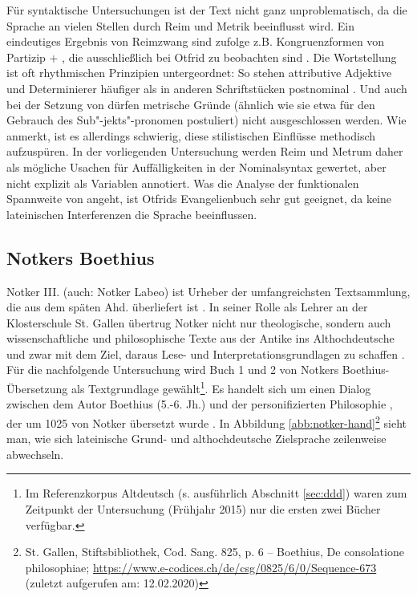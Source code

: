 Für syntaktische Untersuchungen ist der Text nicht ganz unproblematisch, da die Sprache an vielen Stellen durch Reim und Metrik beeinflusst wird. Ein eindeutiges Ergebnis von  Reimzwang sind \textcite[35f.]{Fleischer2006} zufolge z.B. Kongruenzformen von Partizip + , die ausschließlich bei Otfrid zu beobachten sind \parencites()()[s. auch][52]{Fleischer2011}[]{Gillmann2016}. 
Die Wortstellung ist oft rhythmischen Prinzipien untergeordnet: So stehen attributive Adjektive und Determinierer häufiger als in anderen Schriftstücken postnominal \parencites()()[282f.]{Oubouzar1989}[29]{Schrodt2004}. Und auch bei der Setzung von  dürfen metrische Gründe (ähnlich wie  \textcite{Eggenberger1961} sie etwa für den Gebrauch des Sub"-jekts"-pronomen postuliert) nicht ausgeschlossen werden. Wie \textcite[37]{Fleischer2006} anmerkt, ist es allerdings schwierig, diese stilistischen Einflüsse methodisch aufzuspüren. In der vorliegenden Untersuchung werden Reim und Metrum daher als mögliche Usachen für Auffälligkeiten in der Nominalsyntax gewertet, aber nicht explizit als Variablen annotiert. Was die Analyse der funktionalen Spannweite von  angeht, ist Otfrids Evangelienbuch sehr gut geeignet, da keine lateinischen Interferenzen die Sprache beeinflussen. 

\subsection{Notkers Boethius} \label{sec:notker}

Notker III. (auch: Notker Labeo) ist Urheber der umfangreichsten Textsammlung, die aus dem späten Ahd. überliefert ist \parencites[157]{Meineke2001}. In seiner Rolle als Lehrer an der Klosterschule St. Gallen übertrug Notker nicht nur theologische, sondern auch wissenschaftliche und philosophische Texte aus der Antike ins Althochdeutsche und zwar mit dem Ziel, daraus Lese- und Interpretationsgrundlagen zu schaffen \parencite[zur Übersicht s.][136]{Sonderegger2003}. Für die nachfolgende Untersuchung wird Buch 1 und 2 von Notkers Boethius-Übersetzung  als Textgrundlage gewählt\footnote{Im Referenzkorpus Altdeutsch (s. ausführlich Abschnitt \ref{sec:ddd}) waren zum Zeitpunkt der Untersuchung (Frühjahr 2015) nur die ersten zwei Bücher verfügbar.}. Es handelt sich um einen Dialog zwischen dem Autor Boethius (5.-6. Jh.) und der personifizierten Philosophie \parencite[vgl.][]{Gruber2006}, der um 1025 von Notker übersetzt wurde \parencite[138]{Sonderegger2003}. 
In Abbildung \ref{abb:notker-hand}\footnote{St. Gallen, Stiftsbibliothek, Cod. Sang. 825, p. 6 – Boethius, De consolatione philosophiae; \url{https://www.e-codices.ch/de/csg/0825/6/0/Sequence-673} (zuletzt aufgerufen am: 12.02.2020)} sieht man, wie sich lateinische Grund- und althochdeutsche Zielsprache zeilenweise abwechseln.   

